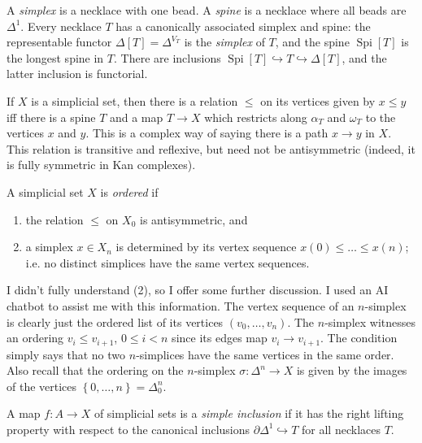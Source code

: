 A \emph{simplex} is a necklace with one bead. A \emph{spine} is a necklace where all beads are $\Delta ^1$. Every necklace $T$ has a canonically associated simplex and spine: the representable functor $\Delta [T]=\Delta^{V_T} $ is the \emph{simplex} of $T$, and the spine $\operatorname{Spi} [T]$ is the longest spine in $T$. There are inclusions $\operatorname{Spi} [T]\hookrightarrow T\hookrightarrow \Delta [T]$, and the latter inclusion is functorial.

If $X$ is a simplicial set, then there is a relation $\leq $ on its vertices given by $x\leq y$ iff there is a spine $T$ and a map $T\to X$ which restricts along $\alpha _T$ and $\omega _T$ to the vertices $x$ and $y$. This is a complex way of saying there is a path $x\to y$ in $X$. This relation is transitive and reflexive, but need not be antisymmetric (indeed, it is fully symmetric in Kan complexes).

\begin{definition}\label{1.3.1.2}
	A simplicial set $X$ is \emph{ordered} if
	\begin{enumerate}
		\item the relation $\leq $ on $X_0$ is antisymmetric, and
		\item a simplex $x\in X_n$ is determined by its vertex sequence $x(0)\leq \ldots \leq x(n)$; i.e. no distinct simplices have the same vertex sequences.
	\end{enumerate}
\end{definition}

I didn't fully understand (2), so I offer some further discussion. I used an AI chatbot to assist me with this information. The vertex sequence of an $n$-simplex is clearly just the ordered list of its vertices $(v_0, \ldots ,v_n)$. The $n$-simplex witnesses an ordering $v_i \leq v_{i+1} $, $0\leq i<n$ since its edges map $v_i\to v_{i+1} $. The condition simply says that no two $n$-simplices have the same vertices in the same order. Also recall that the ordering on the $n$-simplex $\sigma : \Delta ^n \to X$ is given by the images of the vertices $\left\{ 0, \ldots ,n \right\} =\Delta ^n_0$.

\begin{definition}\label{1.3.1.3}
	A map $f : A \to X$ of simplicial sets is a \emph{simple inclusion} if it has the right lifting property with respect to the canonical inclusions $\partial \Delta ^1\hookrightarrow T$ for all necklaces $T$.
\end{definition}


